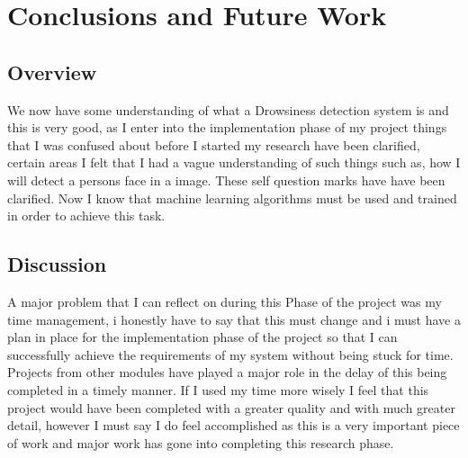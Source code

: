 \chapter{Conclusions and Future Work}
\label{chap:conclusions}
\section{Overview}
We now have some understanding of what a Drowsiness detection system is and this is very good,  as I enter into the implementation phase of my project things that I was confused about before I started my research have been clarified, certain areas I felt that I had a vague understanding of such things such as, how I will detect a persons face in a image. These self question marks have  have been clarified. Now I know that machine learning algorithms must be used and trained in order to achieve this task. 

\section{Discussion}
A major problem that I can reflect on during this Phase of the project was my time management, i honestly have to say that this must change and i must have a plan in place for the implementation phase of the project so that I can successfully achieve the requirements of my system without being stuck for time. Projects from other modules have played a major role in the delay of this being completed in a timely manner. If I used my time more wisely I feel that this project would have been completed with a greater quality and with much greater detail, however I must say I do feel accomplished as this is a very important piece of work and major work has gone into completing this research phase.

